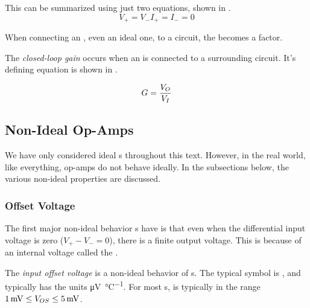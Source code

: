 This can be summarized using just two equations, shown in .
\begin{subequations}
  \begin{equation}\label{eq:Ideal_Op-Amp-Voltage}
    V_{+} = V_{-}
  \end{equation}
  \begin{equation}\label{eq:Ideal_Op-Amp-Current}
    I_{+} = I_{-} = 0
  \end{equation}
\end{subequations}

When connecting an , even an ideal one, to a circuit, the  becomes a factor.

\begin{definition}\label{def:Closed-Loop_Gain}
  The \emph{closed-loop gain} occurs when an  is connected to a surrounding circuit.
  It's defining equation is shown in .

  \begin{equation}\label{eq:Closed-Loop_Gain}
    G = \frac{V_{O}}{V_{I}}
  \end{equation}
\end{definition}

\subsection{Non-Ideal Op-Amps}\label{subsec:Non-Ideal_Op-Amps}
We have only considered ideal s throughout this text.
However, in the real world, like everything, op-amps do not behave ideally.
In the subsections below, the various non-ideal properties are discussed.

\subsubsection{Offset Voltage}\label{subsubsec:Offset_Voltage}
The first major non-ideal behavior s have is that even when the differential input voltage is zero ($V_{+} - V_{-} = 0$), there is a finite output voltage.
This is because of an internal voltage called the .

\begin{definition}\label{def:Input_Offset_Voltage}
  The \emph{input offset voltage} is a non-ideal behavior of s.
  The typical symbol is , and typically has the units \si{\micro\volt\per\degreeCelsius}.
  For most s,  is typically in the range $\SI{1}{\milli\volt} \leq V_{OS} \leq \SI{5}{\milli\volt}$.
\end{definition}


